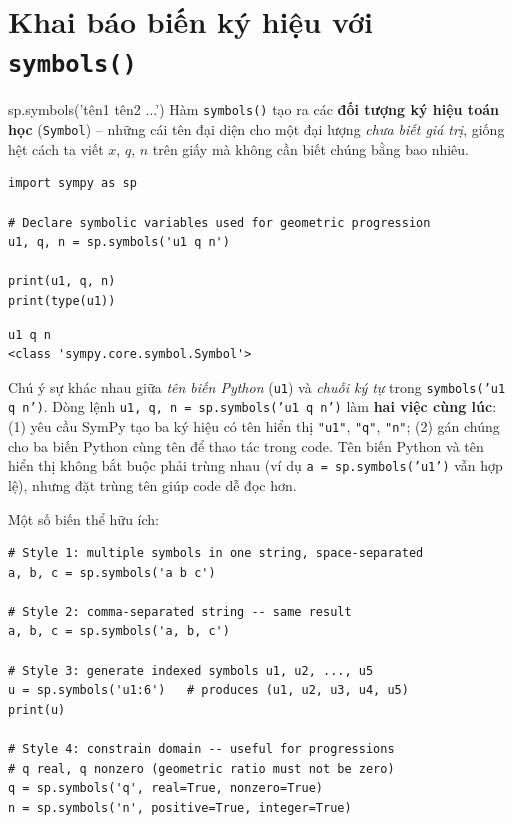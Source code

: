 \documentclass[12pt,a4paper]{report}
\newcommand{\pycmd}[1]{\texttt{\color{kw}#1}}
\begin{document}
\section{Khai báo biến ký hiệu với \texttt{symbols()}}

\begin{syntaxbox}{sp.symbols('tên1 tên2 ...')}
Hàm \pycmd{symbols()} tạo ra các \textbf{đối tượng ký hiệu toán học}
(\texttt{Symbol}) -- những cái tên đại diện cho một đại lượng \emph{chưa
biết giá trị}, giống hệt cách ta viết $x$, $q$, $n$ trên giấy mà không
cần biết chúng bằng bao nhiêu.
\end{syntaxbox}

\begin{lstlisting}[caption={Khai báo các biến của bài toán cấp số nhân}]
import sympy as sp

# Declare symbolic variables used for geometric progression
u1, q, n = sp.symbols('u1 q n')

print(u1, q, n)
print(type(u1))
\end{lstlisting}

\begin{lstlisting}[style=outstyle,caption={Kết quả in ra}]
u1 q n
<class 'sympy.core.symbol.Symbol'>
\end{lstlisting}

\begin{infobox}
Chú ý sự khác nhau giữa \emph{tên biến Python} (\texttt{u1}) và
\emph{chuỗi ký tự} trong \texttt{symbols('u1 q n')}. Dòng lệnh
\texttt{u1, q, n = sp.symbols('u1 q n')} làm \textbf{hai việc cùng lúc}:
(1) yêu cầu SymPy tạo ba ký hiệu có tên hiển thị \texttt{"u1"},
\texttt{"q"}, \texttt{"n"}; (2) gán chúng cho ba biến Python cùng tên để
thao tác trong code. Tên biến Python và tên hiển thị không bắt buộc
phải trùng nhau (ví dụ \texttt{a = sp.symbols('u1')} vẫn hợp lệ), nhưng
đặt trùng tên giúp code dễ đọc hơn.
\end{infobox}

Một số biến thể hữu ích:

\begin{lstlisting}[caption={Các cách khai báo biến khác nhau}]
# Style 1: multiple symbols in one string, space-separated
a, b, c = sp.symbols('a b c')

# Style 2: comma-separated string -- same result
a, b, c = sp.symbols('a, b, c')

# Style 3: generate indexed symbols u1, u2, ..., u5
u = sp.symbols('u1:6')   # produces (u1, u2, u3, u4, u5)
print(u)

# Style 4: constrain domain -- useful for progressions
# q real, q nonzero (geometric ratio must not be zero)
q = sp.symbols('q', real=True, nonzero=True)
n = sp.symbols('n', positive=True, integer=True)
\end{lstlisting}
\end{document}

